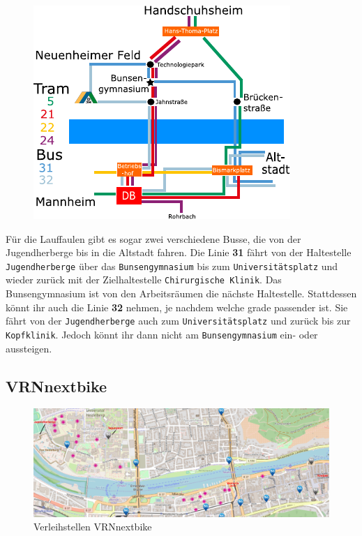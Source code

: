 \begin{figure}[t]
\centering
\includegraphics[width=\textwidth]{media/vrn.pdf}
\end{figure}

Für die Lauffaulen gibt es sogar zwei verschiedene Busse, die von der Jugendherberge bis in die Altstadt fahren. Die Linie \textbf{31} fährt von der Haltestelle \texttt{Jugendherberge} über das \texttt{Bunsengymnasium} bis zum \texttt{Universitätsplatz} und wieder zurück mit der Zielhaltestelle \texttt{Chirurgische Klinik}. Das Bunsengymnasium ist von den Arbeitsräumen die nächste Haltestelle. Stattdessen könnt ihr auch die Linie \textbf{32} nehmen, je nachdem welche grade passender ist. Sie fährt von der \texttt{Jugendherberge} auch zum \texttt{Universitätsplatz} und zurück bis zur \texttt{Kopfklinik}. Jedoch könnt ihr dann nicht am \texttt{Bunsengymnasium} ein- oder aussteigen.

\subsection{VRNnextbike}

\begin{figure}[t]
  \includegraphics[width=1.0\textwidth]{chapters/heidelberg/nextbike}
  \caption*{Verleihstellen VRNnextbike}
  \label{nextbike}
\end{figure}

